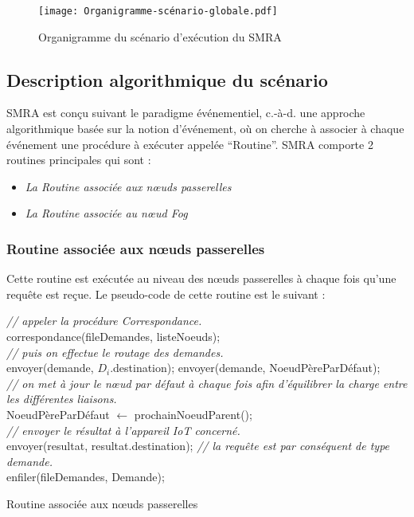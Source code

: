 \begin{figure}[H]
  \centering
  \texttt{[image: Organigramme-scénario-globale.pdf]}
  \caption{Organigramme du scénario d'exécution du SMRA}
  \label{fig:Organigrame_scénario_globale}
\end{figure}


\subsection{Description algorithmique du scénario}


SMRA est conçu suivant le paradigme événementiel, c.-à-d. une approche algorithmique basée sur la notion d'événement, où on cherche à associer à chaque événement une procédure à exécuter appelée “Routine”.   
SMRA comporte 2 routines principales qui sont :
\begin{itemize}
    \item \emph{La Routine associée aux nœuds passerelles}
    \item \emph{La Routine associée au nœud Fog}
\end{itemize}


\subsubsection{Routine associée aux nœuds passerelles}
Cette routine est exécutée au niveau des nœuds passerelles à chaque fois qu'une requête est reçue.
Le pseudo-code de cette routine est le suivant :\\
\begin{algorithm}[H]
  {  
    \emph{// appeler la  procédure Correspondance.}\\
    correspondance(fileDemandes, listeNoeuds);\\
    \emph{// puis on effectue le routage des demandes.}\\
    {
      {
        envoyer(demande, $D_i$.destination);
      }
      {
        envoyer(demande, NoeudPèreParDéfaut);\\
        \emph{// on met à jour le nœud par défaut à chaque fois afin d'équilibrer la charge entre les différentes liaisons.}\\
        NoeudPèreParDéfaut $\gets$ prochainNoeudParent();\\
      }
    }
  }
  {
    {
      \emph{// envoyer le résultat à l'appareil IoT concerné.}\\
      envoyer(resultat, resultat.destination);
    }
    {
      \emph{// la requête est par conséquent de type demande.}\\
      enfiler(fileDemandes, Demande);
    }
  }
  \caption{Routine associée aux nœuds passerelles}
\end{algorithm}
\\
